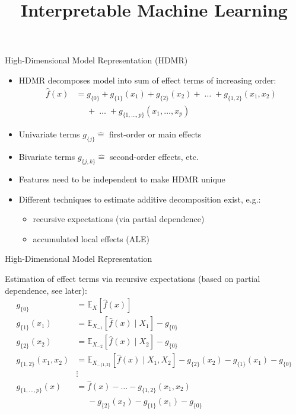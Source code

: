 \documentclass[11pt,compress,t,notes=noshow, aspectratio=169, xcolor=table]{beamer}
\title{Interpretable Machine Learning}
\date{}
\begin{document}
\newcommand{\titlefigure}{figure/open_blackbox}
\newcommand{\learninggoals}{
\item What are additive decomposition of prediction functions?
\item Why are they useful?
\item How do we obtain them?}

 
\begin{frame}{High-Dimensional Model Representation (HDMR)}

\begin{itemize}
\itemsep1em
\item
HDMR decomposes model into sum of effect terms of increasing order:
\begin{align*}
\hat{f}(x) &= g_{\{0\}} + g_{\{1\}}(x_1) + g_{\{2\}}(x_2) + \;\dots\; + g_{\{1, 2\}}(x_1, x_2) \\
&\phantom{{}={}} + \;\dots\; + g_{\{1,\ldots,p\}}(x_1, \ldots,x_p)
\end{align*}
\item Univariate terms $g_{\{j\}} \hat = $ first-order or main effects
\item Bivariate terms $g_{\{j, k\}} \hat = $ second-order effects, etc.
\item Features need to be independent to make HDMR unique
\item Different techniques to estimate additive decomposition exist, e.g.:
		\begin{itemize}
			\item recursive expectations (via partial dependence) 
			\item accumulated local effects (ALE)
		\end{itemize}
\end{itemize}
\end{frame}

\begin{frame}{High-Dimensional Model Representation}

Estimation of effect terms via recursive expectations (based on partial dependence, see later):
\begin{align*}
 g_{\{0\}} &= \mathbb{E}_X\left[\widehat{f}(x)\right] \\
 g_{\{1\}}(x_1) &= \mathbb{E}_{X_{-1}}\left[\widehat{f}(x) \; \vert  \; X_1 \right] - g_{\{0\}} \\
 g_{\{2\}}(x_2) &= \mathbb{E}_{X_{-2}}\left[\widehat{f}(x) \; \vert  \; X_2 \right] - g_{\{0\}} \\
 g_{\{1, 2\}}(x_1, x_2) &= \mathbb{E}_{X_{-\{1,2\}}}\left[\widehat{f}(x) \; \vert \; X_1, X_2 \right] - g_{\{2\}}(x_2) - g_{\{1\}}(x_1) - g_{\{0\}}\\
 &\vdots \\
 g_{\{1, \dots, p\}}(x) &= \widehat{f}(x) - \dots - g_{\{1, 2\}}(x_1, x_2) \\
 &\phantom{{}={}} - g_{\{2\}}(x_2) - g_{\{1\}}(x_1) - g_{\{0\}}\\
\end{align*}

\end{frame}
\end{document}
